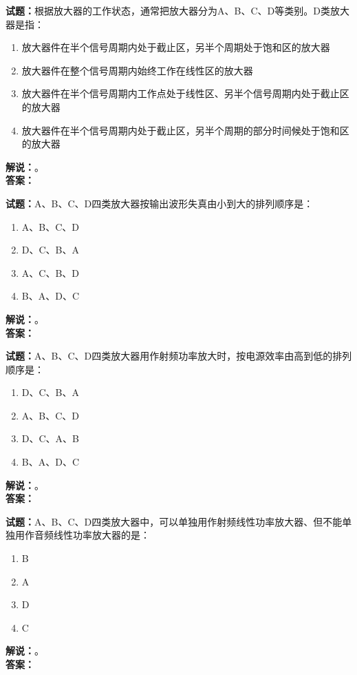 \documentclass{ctexbook}
\begin{document}
\vspace{\baselineskip}

\noindent\textbf{试题：}根据放大器的工作状态，通常把放大器分为A、B、C、D等类别。D类放大器是指：
\begin{enumerate}[leftmargin=3em]
  \item 放大器件在半个信号周期内处于截止区，另半个周期处于饱和区的放大器
  \item 放大器件在整个信号周期内始终工作在线性区的放大器
  \item 放大器件在半个信号周期内工作点处于线性区、另半个信号周期内处于截止区的放大器
  \item 放大器件在半个信号周期内处于截止区，另半个周期的部分时间候处于饱和区的放大器
\end{enumerate}
\noindent\textbf{解说：}\textbf{}。\\\noindent\textbf{答案：}

\vspace{\baselineskip}

\noindent\textbf{试题：}A、B、C、D四类放大器按输出波形失真由小到大的排列顺序是：
\begin{enumerate}[leftmargin=3em]
  \item A、B、C、D
  \item D、C、B、A
  \item A、C、B、D
  \item B、A、D、C
\end{enumerate}
\noindent\textbf{解说：}\textbf{}。\\\noindent\textbf{答案：}

\vspace{\baselineskip}

\noindent\textbf{试题：}A、B、C、D四类放大器用作射频功率放大时，按电源效率由高到低的排列顺序是：
\begin{enumerate}[leftmargin=3em]
  \item D、C、B、A
  \item A、B、C、D
  \item D、C、A、B
  \item B、A、D、C
\end{enumerate}
\noindent\textbf{解说：}\textbf{}。\\\noindent\textbf{答案：}

\vspace{\baselineskip}

\noindent\textbf{试题：}A、B、C、D四类放大器中，可以单独用作射频线性功率放大器、但不能单独用作音频线性功率放大器的是：
\begin{enumerate}[leftmargin=3em]
  \item B
  \item A
  \item D
  \item C
\end{enumerate}
\noindent\textbf{解说：}\textbf{}。\\\noindent\textbf{答案：}
\end{document}
